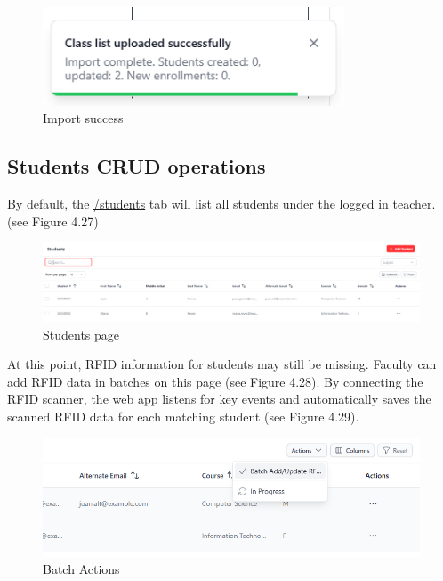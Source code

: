 \begin{figure}[h] %
	\centering
	\includegraphics[width=0.8\textwidth]{figures/chapter4/faculty_import_success.png} %
	\caption{Import success}
	\label{fig:faculty_import_success}
\end{figure}
\clearpage
\subsection{Students CRUD operations}
By default, the \url{/students} tab will list all students under the logged in teacher. (see Figure 4.27)
\begin{figure}[h] %
	\centering
	\includegraphics[width=1\textwidth]{figures/chapter4/student_list.png} %
	\caption{Students page}
	\label{fig:student_list}
\end{figure}
At this point, RFID information for students may still be missing. Faculty can add RFID data in batches on this page (see Figure 4.28). By connecting the RFID scanner, the web app listens for key events and automatically saves the scanned RFID data for each matching student (see Figure 4.29).
\begin{figure}[h] %
	\centering
	\includegraphics[width=1\textwidth]{figures/chapter4/batch_rfid.png} %
	\caption{Batch Actions}
	\label{fig:batch_rfid}
\end{figure}
